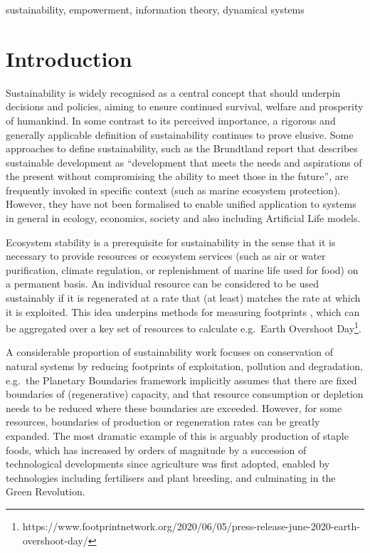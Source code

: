 \documentclass[conference]{IEEEtran}
\begin{document}
\begin{IEEEkeywords}
sustainability, empowerment, information theory, dynamical systems
\end{IEEEkeywords}


\section{Introduction}

Sustainability is widely recognised as a central concept that should
underpin decisions and policies, aiming to ensure continued survival,
welfare and prosperity of humankind. In some contrast to its perceived
importance, a rigorous and generally applicable definition of
sustainability continues to prove elusive. Some approaches to define
sustainability, such as the Brundtland report that describes
sustainable development as ``development that meets the needs and
aspirations of the present without compromising the ability to meet
those in the future''\cite{Brundlandcommission1987}, are frequently
invoked in specific context (such as marine ecosystem protection).
However, they have not been formalised to enable unified application
to systems in general in ecology, economics, society and also
including Artificial Life models.

Ecosystem stability is a prerequisite for sustainability in the sense
that it is necessary to provide resources or ecosystem services (such
as air or water purification, climate regulation, or replenishment of
marine life used for food) on a permanent basis. An individual
resource can be considered to be used sustainably if it is regenerated
at a rate that (at least) matches the rate at which it is exploited.
This idea underpins methods for measuring footprints
\cite{Wackernagel2019_defyingthefootprintoracle}, which can be
aggregated over a key set of resources to calculate e.g.\ Earth
Overshoot
Day\footnote{https://www.footprintnetwork.org/2020/06/05/press-release-june-2020-earth-overshoot-day/}.

A considerable proportion of sustainability work focuses on
conservation of natural systems by reducing footprints of
exploitation, pollution and degradation, e.g.\ the Planetary
Boundaries
framework \cite{Steffen2015_planetaryboundaries}
implicitly assumes that there are fixed boundaries of (regenerative)
capacity, and that resource consumption or depletion needs to be
reduced where these boundaries are exceeded. However, for some
resources, boundaries of production or regeneration rates can be
greatly expanded. The most dramatic example of this is arguably
production of staple foods, which has increased by orders of magnitude
by a succession of technological developments since agriculture was
first adopted, enabled by technologies including fertilisers and
plant breeding, and culminating in the Green Revolution.
\end{document}
